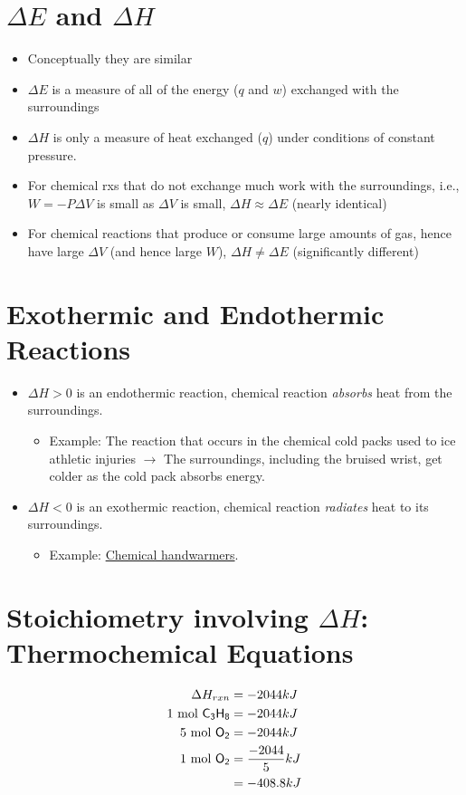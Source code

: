 \documentclass[
	chapter=6,
	title={Thermochemistry},
	showanswers=true,
]{chem122notes}
\begin{document}
\section{$\Delta E$ and $\Delta H$}\label{sec:e-and-h}
\begin{itemize}
	\item Conceptually they are similar
	\item $\Delta E$ is a measure of all of the energy ($q$ and $w$) exchanged with the surroundings
	\item $\Delta H$ is only a measure of heat exchanged ($q$) under conditions of constant pressure.
	\item For chemical rxs that do not exchange much work with the surroundings, i.e., $W=-P\Delta V$ is small as $\Delta V$ is small, $\Delta H \approx \Delta E$ (nearly identical)
	\item For chemical reactions that produce or consume large amounts of gas, hence have large $\Delta V$ (and hence large $W$), $\Delta H \neq \Delta E$ (significantly different)
\end{itemize}

\section{Exothermic and Endothermic Reactions}\label{sec:exothermic-and-endothermic-reactions}
\begin{itemize}
	\item $\Delta H > 0$ is an endothermic reaction, chemical reaction \emph{absorbs} heat from the surroundings.
	\begin{itemize}
		\item Example: The reaction that occurs in the chemical cold packs used to ice athletic injuries $\rightarrow$ The surroundings, including the bruised wrist, get colder as the cold pack absorbs energy.
	\end{itemize}
	\item $\Delta H < 0$ is an exothermic reaction, chemical reaction \emph{radiates} heat to its surroundings.
	\begin{itemize}
		\item Example: \hyperref[dfn:chemical-handwarmers]{Chemical handwarmers}.
	\end{itemize}
\end{itemize}

\section{Stoichiometry involving $\Delta H$: Thermochemical Equations}\label{sec:stoichiometry-involving-$delta-h$:-thermochemical-equations}
\begin{equation*}
\begin{aligned}
	\Delta H_{rxn} &= -2044 kJ\\
	1 \mbox{ mol } \ce{C3H8} &= -2044 kJ\\
	5 \mbox{ mol } \ce{O2} &= -2044 kJ\\
	1 \mbox{ mol } \ce{O2} &= \frac{-2044}{5} kJ\\
	 &= -408.8 kJ\\
\end{aligned}
\end{equation*}
\end{document}
